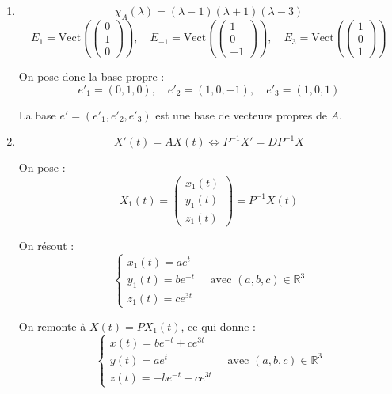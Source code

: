 \documentclass[a4paper,12pt,oneside]{book}
\newenvironment{solution}{\begin{solutionbox}}{\end{solutionbox}}
\begin{document}
\begin{solution}
	\begin{enumerate}
		\item
		\[
		\chi_A(\lambda) = (\lambda - 1)(\lambda + 1)(\lambda - 3)
		\]
		\[
		E_1 = \mathrm{Vect}\left( \begin{pmatrix} 0 \\ 1 \\ 0 \end{pmatrix} \right), \quad
		E_{-1} = \mathrm{Vect}\left( \begin{pmatrix} 1 \\ 0 \\ -1 \end{pmatrix} \right), \quad
		E_3 = \mathrm{Vect}\left( \begin{pmatrix} 1 \\ 0 \\ 1 \end{pmatrix} \right)
		\]
		
		On pose donc la base propre :
		\[
		e'_1 = (0,1,0),\quad e'_2 = (1,0,-1),\quad e'_3 = (1,0,1)
		\]
		
		La base \( e' = (e'_1, e'_2, e'_3) \) est une base de vecteurs propres de \( A \).
		
		\item
		\[
		X'(t) = AX(t) \iff P^{-1}X' = DP^{-1}X
		\]
		
		On pose :
		\[
		X_1(t) = \begin{pmatrix} x_1(t) \\ y_1(t) \\ z_1(t) \end{pmatrix} = P^{-1}X(t)
		\]
		
		On résout :
		\[
		\begin{cases}
			x_1(t) = ae^t \\
			y_1(t) = be^{-t} \\
			z_1(t) = ce^{3t}
		\end{cases}
		\quad \text{avec } (a,b,c) \in \mathbb{R}^3
		\]
		
		On remonte à \( X(t) = P X_1(t) \), ce qui donne :
		\[
		\boxed{
			\begin{cases}
				x(t) = be^{-t} + ce^{3t} \\
				y(t) = ae^t \\
				z(t) = -be^{-t} + ce^{3t}
			\end{cases}
			\quad \text{avec } (a,b,c) \in \mathbb{R}^3
		}
		\]
		
	\end{enumerate}
\end{solution}
\end{document}
